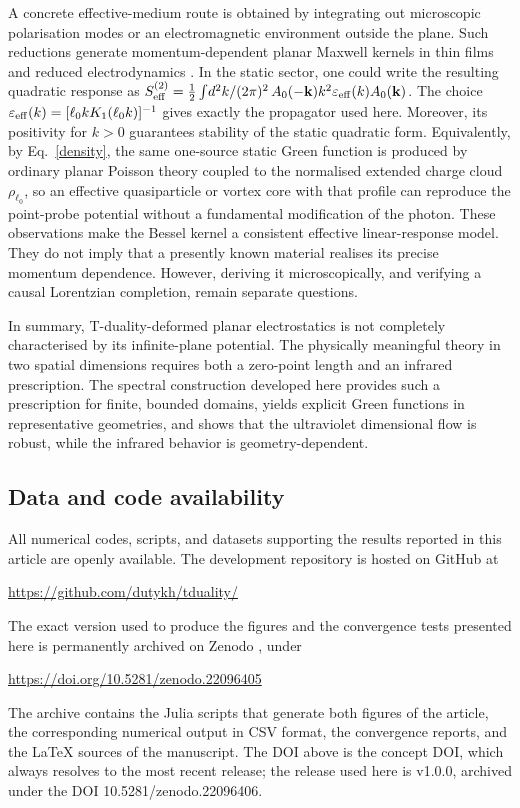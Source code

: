 \documentclass[nopacs,amsmath,amsfonts,amssymb,aps,superscriptaddress]{revtex4}
\newcommand{\revadd}[1]{#1}
\begin{document}
\revadd{A concrete effective-medium route is obtained by integrating out microscopic polarisation modes or an electromagnetic environment outside the plane. Such reductions generate momentum-dependent planar Maxwell kernels in thin films and reduced electrodynamics \cite{Pearl1964, LaNaveLimtragoolPhillips2019}. In the static sector, one could write the resulting quadratic response as $S_{\rm eff}^{(2)}=\tfrac12\int \!d^2k/(2\pi)^2\,A_0(-\mathbf k)k^2\varepsilon_{\rm eff}(k)A_0(\mathbf k)$. The choice $\varepsilon_{\rm eff}(k)=[\ell_0kK_1(\ell_0k)]^{-1}$ gives exactly the propagator used here. Moreover, its positivity for $k>0$ guarantees stability of the static quadratic form. Equivalently, by Eq.~\eqref{density}, the same one-source static Green function is produced by ordinary planar Poisson theory coupled to the normalised extended charge cloud $\rho_{\ell_0}$, so an effective quasiparticle or vortex core with that profile can reproduce the point-probe potential without a fundamental modification of the photon. These observations make the Bessel kernel a consistent effective linear-response model. They do not imply that a presently known material realises its precise momentum dependence. However, deriving it microscopically, and verifying a causal Lorentzian completion, remain separate questions.}

In summary, T-duality-deformed planar electrostatics is not completely characterised by its infinite-plane potential. The physically meaningful theory in two spatial dimensions requires both a zero-point length and an infrared prescription. The spectral construction developed here provides such a prescription for finite, bounded domains, yields explicit Green functions in representative geometries, and shows that the ultraviolet dimensional flow is robust, while the infrared behavior is geometry-dependent.

\subsection*{Data and code availability}

\noindent All numerical codes, scripts, and datasets supporting the results reported in this article are openly available. The development repository is hosted on GitHub at
\begin{center}
  \url{https://github.com/dutykh/tduality/}
\end{center}
The exact version used to produce the figures and the convergence tests presented here is permanently archived on Zenodo \cite{BaticDutykhCode2026}, under
\begin{center}
  \url{https://doi.org/10.5281/zenodo.22096405}
\end{center}
The archive contains the Julia scripts that generate both figures of the article, the corresponding numerical output in CSV format, the convergence reports, and the \LaTeX{} sources of the manuscript. The DOI above is the concept DOI, which always resolves to the most recent release; the release used here is v1.0.0, archived under the DOI 10.5281/zenodo.22096406.


\end{document}
